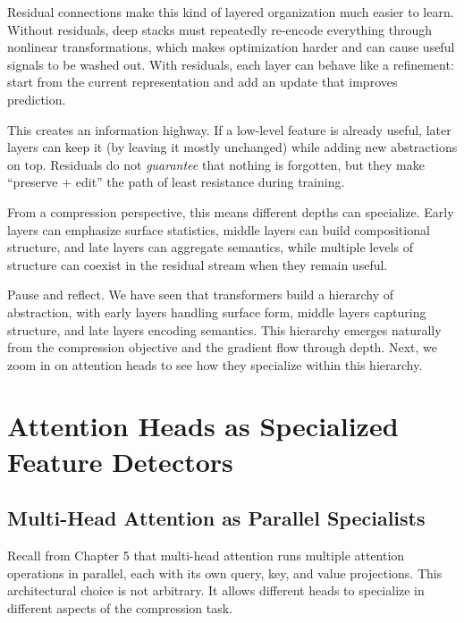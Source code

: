 Residual connections make this kind of layered organization much easier to learn. Without residuals, deep stacks must repeatedly re-encode everything through nonlinear transformations, which makes optimization harder and can cause useful signals to be washed out. With residuals, each layer can behave like a refinement: start from the current representation and add an update that improves prediction.

This creates an information highway. If a low-level feature is already useful, later layers can keep it (by leaving it mostly unchanged) while adding new abstractions on top. Residuals do not \emph{guarantee} that nothing is forgotten, but they make ``preserve + edit'' the path of least resistance during training.

From a compression perspective, this means different depths can specialize. Early layers can emphasize surface statistics, middle layers can build compositional structure, and late layers can aggregate semantics, while multiple levels of structure can coexist in the residual stream when they remain useful.

\vspace{2em}

Pause and reflect. We have seen that transformers build a hierarchy of abstraction, with early layers handling surface form, middle layers capturing structure, and late layers encoding semantics. This hierarchy emerges naturally from the compression objective and the gradient flow through depth. Next, we zoom in on attention heads to see how they specialize within this hierarchy.

\vspace{2em}

\section{Attention Heads as Specialized Feature Detectors}
\label{sec:attention_specialization}

\vspace{1em}

\subsection{Multi-Head Attention as Parallel Specialists}

Recall from Chapter 5 that multi-head attention runs multiple attention operations in parallel, each with its own query, key, and value projections. This architectural choice is not arbitrary. It allows different heads to specialize in different aspects of the compression task.

